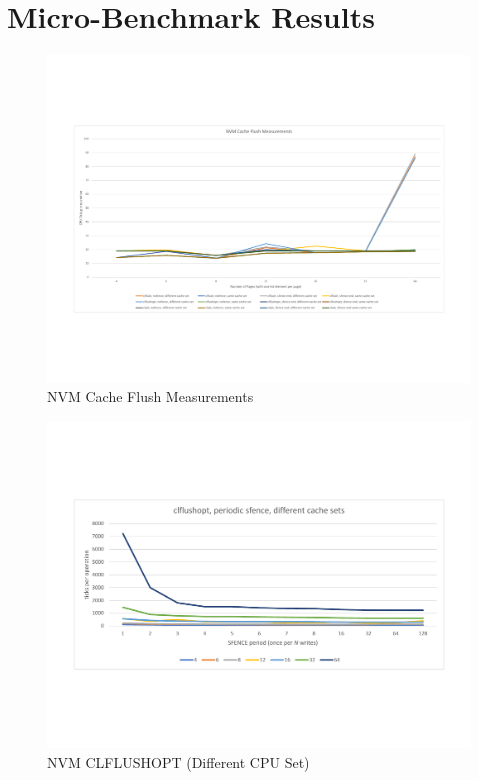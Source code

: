 \section{Micro-Benchmark Results}\label{section:results:micro}

\begin{figure}
    \centering
    \caption{NVM Cache Flush Measurements}\label{micro:cache-flush}
    \includegraphics[scale=0.35]{micro/nvm-cache-flush-measurements.pdf}
\end{figure}

\begin{figure}
    \centering
    \caption{NVM CLFLUSHOPT (Different CPU Set)}\label{micro:clflushopt:different}
    \includegraphics[scale=0.35]{micro/nvm-clflushopt-periodic-different.pdf}
\end{figure}

